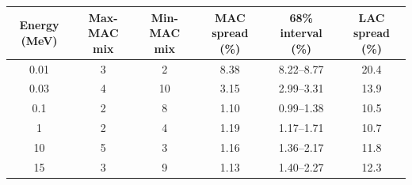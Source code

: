 \begin{tabular}{cccccc}
\toprule
Energy (MeV) & Max-MAC mix & Min-MAC mix & MAC spread (\%) & 68\% interval (\%) & LAC spread (\%) \\
\midrule
0.01 & 3 & 2 & 8.38 & 8.22--8.77 & 20.4 \\
0.03 & 4 & 10 & 3.15 & 2.99--3.31 & 13.9 \\
0.1 & 2 & 8 & 1.10 & 0.99--1.38 & 10.5 \\
1 & 2 & 4 & 1.19 & 1.17--1.71 & 10.7 \\
10 & 5 & 3 & 1.16 & 1.36--2.17 & 11.8 \\
15 & 3 & 9 & 1.13 & 1.40--2.27 & 12.3 \\
\bottomrule
\end{tabular}
